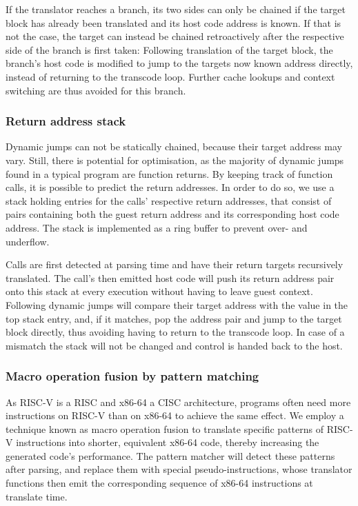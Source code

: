 If the translator reaches a branch, its two sides can only be chained if the target block has already been translated and its host code address is known.
If that is not the case, the target can instead be chained retroactively after the respective side of the branch is first taken: Following translation of the target block, the branch's host code is modified to jump to the targets now known address directly, instead of returning to the transcode loop.
Further cache lookups and context switching are thus avoided for this branch.

\subsubsection{Return address stack}
\label{sec:return-address-stack}
Dynamic jumps can not be statically chained, because their target address may vary.
Still, there is potential for optimisation, as the majority of dynamic jumps found in a typical program are function returns.
By keeping track of function calls, it is possible to predict the return addresses.
In order to do so, we use a stack holding entries for the calls' respective return addresses, that consist of pairs containing both the guest return address and its corresponding host code address.
The stack is implemented as a ring buffer to prevent over- and underflow.

Calls are first detected at parsing time and have their return targets recursively translated.
The call's then emitted host code will push its return address pair onto this stack at every execution without having to leave guest context.
Following dynamic jumps will compare their target address with the value in the top stack entry, and, if it matches, pop the address pair and jump to the target block directly, thus avoiding having to return to the transcode loop.
In case of a mismatch the stack will not be changed and control is handed back to the host.


\subsubsection{Macro operation fusion by pattern matching}
\label{sec:pattern-matching}
As RISC-V is a RISC and x86-64 a CISC architecture, programs often need more instructions on RISC-V than on x86-64 to achieve the same effect.
We employ a technique known as macro operation fusion to translate specific patterns of RISC-V instructions into shorter, equivalent x86-64 code, thereby increasing the generated code's performance.
The pattern matcher will detect these patterns after parsing, and replace them with special pseudo-instructions, whose translator functions then emit the corresponding sequence of x86-64 instructions at translate time.

